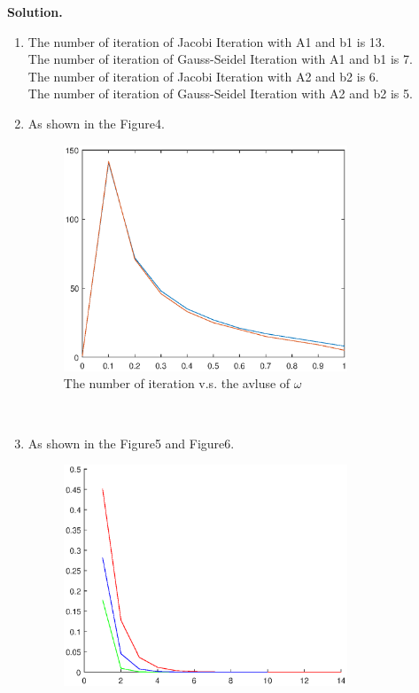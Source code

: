 \documentclass[english,onecolumn]{IEEEtran}
\begin{document}
\noindent
\textbf{Solution.}
\begin{enumerate}
\item
	The number of iteration of Jacobi Iteration with A1 and b1 is 13.\\
	The number of iteration of Gauss-Seidel Iteration with A1 and b1 is 7.\\
	The number of iteration of Jacobi Iteration with A2 and b2 is 6.\\
	The number of iteration of Gauss-Seidel Iteration with A2 and b2 is 5.\\
\item
	As shown in the Figure4.\\
	\begin{figure}[htbp]
				\centering
				\includegraphics[width=0.8\textwidth]{fig3_2.eps}
				\caption{The number of iteration v.s. the avluse of $\omega$}
			\end{figure}\\
\item
	As shown in the Figure5 and Figure6.\\
	\begin{figure}[htbp]
				\centering
				\includegraphics[width=0.8\textwidth]{fig3_3_1.eps}

\end{figure}
\end{enumerate}
\end{document}
